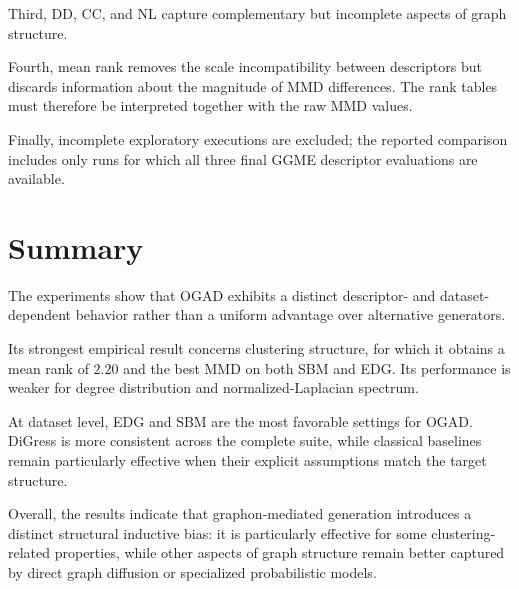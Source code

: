 Third, DD, CC, and NL capture complementary but incomplete aspects of graph structure.

Fourth, mean rank removes the scale incompatibility between descriptors but discards information about the magnitude of MMD differences. The rank tables must therefore be interpreted together with the raw MMD values.

Finally, incomplete exploratory executions are excluded; the reported comparison includes only runs for which all three final GGME descriptor evaluations are available.


\section{Summary}
\label{sec:exp_summary}

The experiments show that OGAD exhibits a distinct descriptor- and dataset-dependent behavior rather than a uniform advantage over alternative generators.

Its strongest empirical result concerns clustering structure, for which it obtains a mean rank of \(2.20\) and the best MMD on both SBM and EDG. Its performance is weaker for degree distribution and normalized-Laplacian spectrum.

At dataset level, EDG and SBM are the most favorable settings for OGAD. DiGress is more consistent across the complete suite, while classical baselines remain particularly effective when their explicit assumptions match the target structure.

Overall, the results indicate that graphon-mediated generation introduces a distinct structural inductive bias: it is particularly effective for some clustering-related properties, while other aspects of graph structure remain better captured by direct graph diffusion or specialized probabilistic models.
